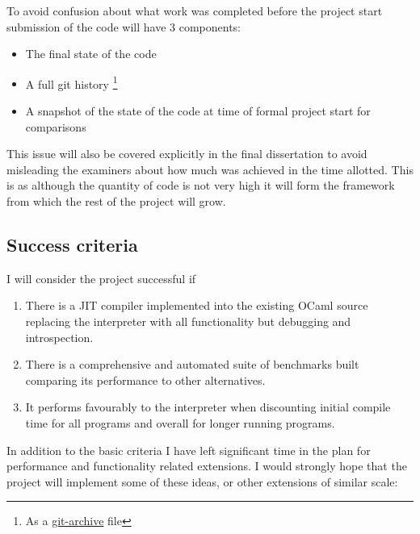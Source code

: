 \documentclass[12pt,a4paper, headings=standardclasses]{scrartcl}
\begin{document}
To avoid confusion about what work was completed before the project start
submission of the code will have 3 components:

\begin{itemize}
      \item The final state of the code
      \item A full git history \footnote{As a \href{https://git-scm.com/docs/git-archive}{git-archive} file}
      \item A snapshot of the state of the code at time of formal project start for comparisons
\end{itemize}

This issue will also be covered explicitly in the final dissertation to avoid
misleading the examiners about how much was achieved in the time allotted. This is as
although the quantity of code is not very high it will form the framework from which the rest
of the project will grow.

\subsection*{Success criteria}

I will consider the project successful if

\begin{enumerate}
      \item There is a JIT compiler implemented into the existing OCaml source
            replacing the interpreter with all functionality but debugging
            and introspection.
      \item There is a comprehensive and automated suite of benchmarks built
            comparing its performance to other alternatives.
      \item It performs favourably to the interpreter when discounting
            initial compile time for all programs and overall for longer running
            programs.
\end{enumerate}

In addition to the basic criteria I have left significant time in the plan
for performance and functionality related extensions. I would strongly hope that the
project will implement some of these ideas, or other extensions of similar scale:
\end{document}
